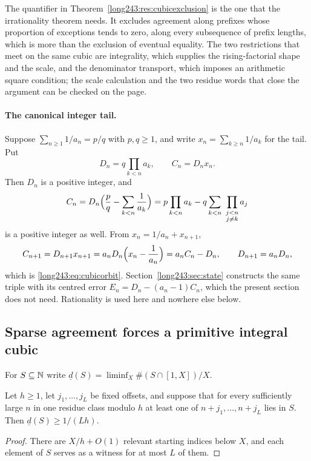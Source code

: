 \documentclass[11pt]{article}
\begin{document}
The quantifier in Theorem~\ref{long243:res:cubicexclusion} is the one that the
irrationality theorem needs.  It excludes agreement along prefixes whose
proportion of exceptions tends to zero, along every subsequence of prefix
lengths, which is more than the exclusion of eventual equality.  The two restrictions that meet on
the same cubic are integrality, which supplies the rising-factorial shape and
the scale, and the denominator transport, which imposes an arithmetic square
condition; the scale calculation and the two residue words that close the
argument can be checked on the page.

\paragraph{The canonical integer tail.}
Suppose $\sum_{n\ge1}1/a_n=p/q$ with $p,q\ge1$, and write
$x_n=\sum_{k\ge n}1/a_k$ for the tail.  Put
\[
 D_n=q\prod_{k<n}a_k,\qquad C_n=D_nx_n .
\]
Then $D_n$ is a positive integer, and
\[
 C_n=D_n\Bigl(\frac pq-\sum_{k<n}\frac1{a_k}\Bigr)
    =p\prod_{k<n}a_k-q\sum_{k<n}\ \prod_{\substack{j<n\\ j\ne k}}a_j
\]
is a positive integer as well.  From $x_n=1/a_n+x_{n+1}$,
\[
 C_{n+1}=D_{n+1}x_{n+1}=a_nD_n\Bigl(x_n-\frac1{a_n}\Bigr)=a_nC_n-D_n,
 \qquad D_{n+1}=a_nD_n,
\]
which is \eqref{long243:eq:cubicorbit}.  Section~\ref{long243:sec:state} constructs the same
triple with its centred error $E_n=D_n-(a_n-1)C_n$, which the present section
does not need.  Rationality is used here and nowhere else below.

\subsection{Sparse agreement forces a primitive integral cubic}

For $S\subseteq\mathbb{N}$ write $\underline d(S)=\liminf_X\#(S\cap[1,X])/X$.

\begin{lemma}\label{long243:res:periodicobstruction}
Let $h\ge1$, let $j_1,\ldots,j_L$ be fixed offsets, and suppose that for every
sufficiently large $n$ in one residue class modulo $h$ at least one of
$n+j_1,\ldots,n+j_L$ lies in $S$.  Then $\underline d(S)\ge1/(Lh)$.
\end{lemma}

\begin{proof}
There are $X/h+O(1)$ relevant starting indices below $X$, and each element of
$S$ serves as a witness for at most $L$ of them.
\end{proof}
\end{document}
